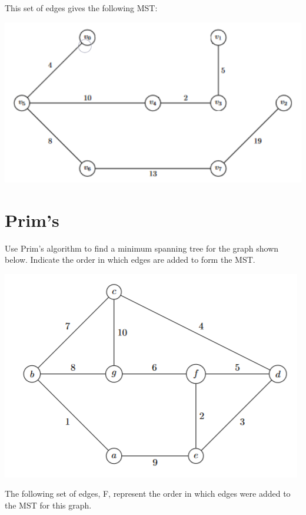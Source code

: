\documentclass[11pt]{article}
\begin{document}
\bigskip
\noindent This set of edges gives the following MST:

\begin{center}
\includegraphics{Q2A.png}
\end{center}

\bigskip
\bigskip

\section{Prim's} %
Use Prim's algorithm to find a minimum spanning tree for the graph shown below. Indicate the order in which edges are added to form the MST.

\begin{center}
\includegraphics{Q3.png}
\end{center}

\bigskip
\bigskip

\noindent The following set of edges, F, represent the order in which edges were added to the MST for this graph.
\end{document}
